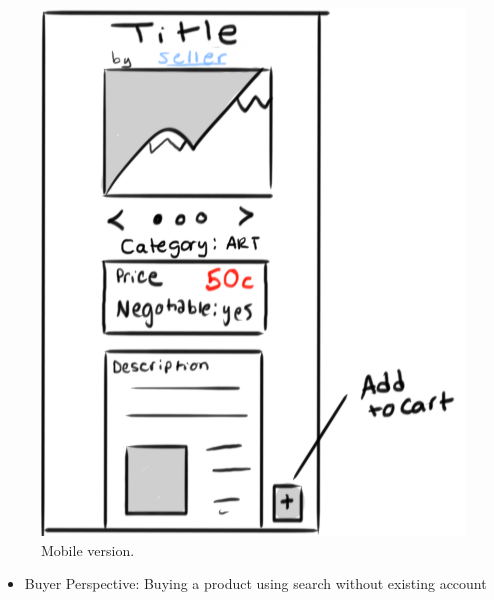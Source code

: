 \documentclass[]{article}
\begin{document}
\begin{enumerate}
			\begin{figure}
			  \includegraphics[width=\linewidth]{./pictures/product_mobile.png}
			  \caption{Mobile version.}
			  \label{fig:mobile5}
			\end{figure}
		\begin{itemize}
			\item Buyer Perspective: Buying a product using search without existing account
		\end{itemize}
		\begin{figure}

\end{figure}
\end{enumerate}
\end{document}
